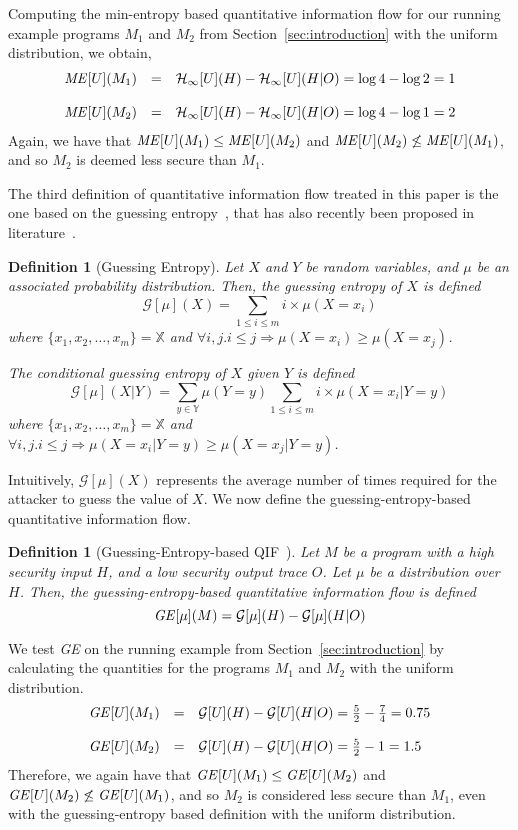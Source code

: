 \documentclass[]{eptcs}
\newcommand{\aset}[1]{\{{#1}\}}
\newtheorem{definition}[theorem]{Definition}
\begin{document}
Computing the min-entropy based quantitative information flow for our
running example programs $M_1$ and $M_2$ from
Section~\ref{sec:introduction} with the uniform distribution, we
obtain,
\[
\begin{array}{rcl}
{\it ME}[U](M_1)&=&\mathcal{H}_\infty[U](H)-\mathcal{H}_\infty[U](H|O)=\log 4-\log 2=1\\&&\\
{\it ME}[U](M_2)&=&\mathcal{H}_\infty[U](H)-\mathcal{H}_\infty[U](H|O)=\log 4 -\log 1=2
\end{array}
\]
Again, we have that ${\it ME}[U](M_1) \leq {\it ME}[U](M_2)$ and ${\it
  ME}[U](M_2) \not\leq {\it ME}[U](M_1)$, and so $M_2$ is deemed less
secure than $M_1$.

The third definition of quantitative information flow treated in this
paper is the one based on the guessing entropy~\cite{Massey94}, that
has also recently been proposed in
literature~\cite{kopf07,DBLP:conf/sp/BackesKR09}.
\begin{definition}[Guessing Entropy]
Let $X$ and $Y$ be random variables, and $\mu$ be an associated probability
distribution.  Then, the guessing entropy of $X$ is defined
\[
\mathcal{G}[\mu](X)=\sum_{1\le i\le m}i\times\mu(X=x_i)
\]
where $\aset{x_1,x_2,\dots,x_{m}} = \mathbb{X}$ and
$\forall i,j.i\le j\Rightarrow \mu(X=x_i)\ge\mu(X=x_j)$.

The conditional guessing entropy of $X$ given $Y$ is defined
\[
\mathcal{G}[\mu](X|Y)=\sum_{y\in{\mathbb Y}}\mu(Y=y)\sum_{1\le i\le m}i\times\mu(X=x_i|Y=y)
\]
where $\aset{x_1,x_2,\dots,x_{m}} = \mathbb{X}$ and $\forall i,j.i\le
j\Rightarrow \mu(X=x_i|Y=y)\ge\mu(X=x_j|Y=y)$.
\end{definition}

Intuitively, $\mathcal{G}[\mu](X)$ represents the average number of
times required for the attacker to guess the value of $X$.  We now
define the guessing-entropy-based quantitative information flow.

\begin{definition}[Guessing-Entropy-based
  QIF~\cite{kopf07,DBLP:conf/sp/BackesKR09}]
\label{def:ge}
Let $M$ be a program with a high security input $H$, and a low
security output trace $O$.  Let $\mu$ be a distribution over $H$.
Then, the guessing-entropy-based quantitative information flow is
defined
\[
{\it GE}[\mu](M)=\mathcal{G}[\mu](H)-\mathcal{G}[\mu](H|O)
\]
\end{definition}

We test {\it GE} on the running example from
Section~\ref{sec:introduction} by calculating the quantities for the
programs $M_1$ and $M_2$ with the uniform distribution.  
\[
\begin{array}{rcl}
{\it GE}[U](M_1) &=&\mathcal{G}[U](H)-\mathcal{G}[U](H|O)=\frac{5}{2} - \frac{7}{4} =  0.75\\\\
{\it GE}[U](M_2)& = &\mathcal{G}[U](H)-\mathcal{G}[U](H|O)=\frac{5}{2} - 1 = 1.5
\end{array}
\]
Therefore, we again have that ${\it GE}[U](M_1) \leq {\it GE}[U](M_2)$
and ${\it GE}[U](M_2) \not\leq {\it GE}[U](M_1)$, and so $M_2$ is
considered less secure than $M_1$, even with the guessing-entropy
based definition with the uniform distribution.
\end{document}
